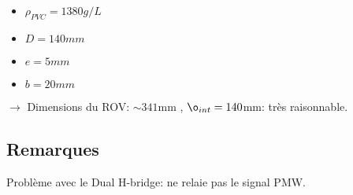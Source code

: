 \documentclass[11pt,a4paper]{article}
\begin{document}
      
      
      \begin{itemize}
        \item $\rho_{PVC} = 1380 g/L$
        \item $D=140mm$
        \item $e=5mm$
        \item $b=20mm$
      \end{itemize}
      $\rightarrow$ Dimensions du ROV: $\sim 341$mm , $\o_{int} = 140$mm: très raisonnable.
      

      
      

        
        
    
    
    \subsection{Remarques}
      Problème avec le Dual H-bridge: ne relaie pas le signal PMW.
      
      
      
\end{document}

